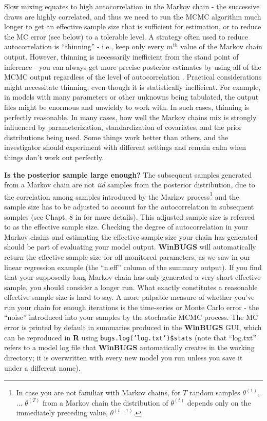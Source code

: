 Slow mixing equates to high autocorrelation in the Markov chain - the
successive draws are highly correlated, and thus we need to run the
MCMC algorithm much longer to get an effective sample size that is
sufficient for estimation, or to reduce the MC error (see below) to a
tolerable level.  A strategy often used to reduce autocorrelation is
``thinning'' - i.e., keep only every $m^{th}$ value of the Markov
chain output. However, thinning is necessarily inefficient from the
stand point of inference - you can always get more precise posterior
estimates by using all of the MCMC output regardless of the level of
autocorrelation \citep{maceachern_berliner:1994,
  link_eaton:2011}. Practical considerations might necessitate
thinning, even though it is statistically inefficient. For example, in
models with many parameters or other unknowns being tabulated, the
output files might be enormous and unwieldy to work with. In such
cases, thinning is perfectly reasonable. In many cases, how well the
Markov chains mix is strongly influenced by parameterization,
standardization of covariates, and the prior distributions being
used. Some things work better than others, and the investigator should
experiment with different settings and remain calm when things don't
work out perfectly.


{\bf Is the posterior sample large enough?}  The subsequent samples
generated from a Markov chain are not {\it iid} samples from the
posterior distribution, due to the correlation among samples
introduced by the Markov process\footnote{In case you are not familiar
  with Markov chains, for $T$ random samples $\theta^ {(1)}$,
  ... $\theta^{(T)}$ from a Markov chain the distribution of
  $\theta^{(t)}$ depends only on the immediately preceding value,
  $\theta^{(t-1)}$.} and the sample size has to be adjusted to account
for the autocorrelation in subsequent samples (see Chapt. 8 in
\citet{robert_casella:2010} for more details). This adjusted sample
size is referred to as the effective sample size. Checking the degree
of autocorrelation in your Markov chains and estimating the effective
sample size your chain has generated should be part of evaluating your
model output. {\bf WinBUGS} will automatically return the effective
sample size for all monitored parameters, as we saw in our linear regression example (the ``n.eff'' column of the summary output). If you find that your
supposedly long Markov chain has only generated a very short effective
sample, you should consider a longer run. What exactly constitutes a
reasonable effective sample size is hard to say. A more palpable
measure of whether you've run your chain for enough iterations is the
time-series or Monte Carlo error - the ``noise'' introduced into your
samples by the stochastic MCMC process. The MC error  is printed by default in summaries produced in the {\bf
  WinBUGS} GUI, which can be reproduced in {\bf R} using {\tt bugs.log('log.txt')\$stats} (note that ``log.txt'' refers to a model log file that {\bf
  WinBUGS} automatically creates in the working directory; it is overwritten with every new model you run unless you save it under a different name).
 
